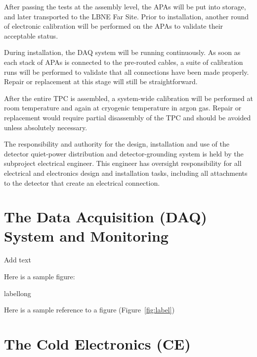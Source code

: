 
After passing the tests at the assembly level, the APAs will be put into storage, and later transported to the LBNE Far Site. Prior to installation, another round of electronic calibration will be performed on the APAs to validate their acceptable status. 

During installation, the DAQ system will be running continuously. As soon as each stack of APAs is connected to the pre-routed cables, a suite of calibration runs will be performed to validate that all connections have been made properly. Repair or replacement at this stage will still be straightforward. 

After the entire TPC is assembled, a system-wide calibration will be performed at room temperature and again at cryogenic temperature in argon gas. Repair or replacement would require partial disassembly of the TPC and should be avoided unless absolutely necessary. 

The responsibility and authority for the design, installation and use of the detector quiet-power distribution and detector-grounding system is held by the subproject electrical engineer. This engineer has oversight responsibility for all electrical and electronics design and installation tasks, including all attachments to the detector that create an electrical connection. 

\section{The Data Acquisition (DAQ) System and Monitoring} 
\label{sec:detectors-fd-ref-daq}

Add text

Here is a sample figure: 

\begin{cdrfigure}[short]{label}{long}
\end{cdrfigure}


Here is a sample reference to a figure (Figure~\ref{fig:label})

\section{The Cold Electronics (CE)} 
\label{sec:detectors-fd-ref-ce}

